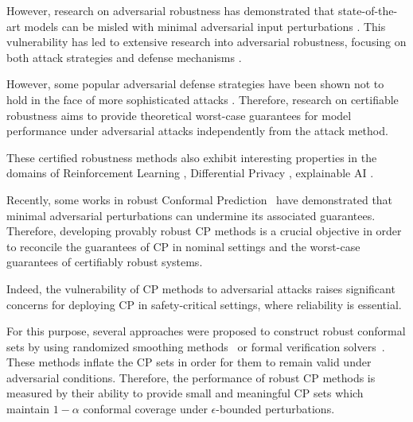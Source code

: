 However, research on adversarial robustness has demonstrated that state-of-the-art models can be misled with minimal adversarial input perturbations \cite{szegedy2014intriguingpropertiesneuralnetworks}.
This vulnerability has led to extensive research into adversarial robustness, focusing on both attack strategies and defense mechanisms \cite{goodfellow2015explainingharnessingadversarialexamples,carlini2017evaluatingrobustnessneuralnetworks}.

However, some popular adversarial defense strategies have been shown not to hold in the face of more sophisticated attacks \cite{athalye2018obfuscatedgradientsfalsesense}.
Therefore, research on certifiable robustness aims to provide theoretical worst-case guarantees for model performance under adversarial attacks independently from the attack method. 

These certified robustness methods also exhibit interesting properties in the domains of Reinforcement Learning \cite{liprl, formalverificationtrajectory}, Differential Privacy \cite{lipdp,wu2024augmentsmoothreconcilingdifferential}, explainable AI \cite{serrurier2024explainableproperties1lipschitzneural,Fel_2023_CVPR}.


\vspace{1cm} %

Recently, some works in robust Conformal Prediction~\cite{li2024data,ledda2023adversarialattacksuncertaintyquantification,liu2024pitfallspromiseconformalinference} have demonstrated that minimal adversarial perturbations can undermine its associated guarantees.
Therefore, developing provably robust CP methods is a crucial objective in order to reconcile the guarantees of CP in nominal settings and the worst-case guarantees of certifiably robust systems.

Indeed, the vulnerability of CP methods to adversarial attacks raises significant concerns for deploying CP in safety-critical settings, where reliability is essential.

For this purpose, several approaches were proposed to construct robust conformal sets by using randomized smoothing methods~\cite{rscp,rscp_plus} or formal verification solvers~\cite{vrcp}. 
These methods inflate the CP sets in order for them to remain valid under adversarial conditions. 
Therefore, the performance of robust CP methods is measured by their ability to provide small and meaningful CP sets which maintain $1-\alpha$ conformal coverage under $\epsilon$-bounded perturbations.

